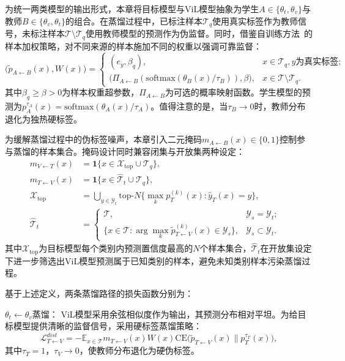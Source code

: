 为统一两类模型的输出形式，本章将目标模型与ViL模型抽象为学生$A\in\{\theta_t,\theta_v\}$与教师$B\in\{\theta_v,\theta_t\}$的组合。在蒸馏过程中，已标注样本$\mathcal{T}_q$使用真实标签作为教师信号，未标注样本$\mathcal{T}\setminus\mathcal{T}_q$使用教师模型的预测作为伪监督。同时，借鉴自训练方法~\cite{liang2021source}的样本加权策略，对不同来源的样本施加不同的权重以强调可靠监督：
\begin{equation}
\big(\tilde{p}_{A\leftarrow B}(x), W(x)\big) =
\begin{cases}
(e_y, \beta_q), & x\in\mathcal{T}_q, y\text{为真实标签};\\
\big(\Pi_{A\leftarrow B}(\mathrm{softmax}(\theta_B(x)/\tau_B)), \beta\big), & x\in\mathcal{T}\setminus\mathcal{T}_q.
\end{cases}
\label{eq:teacher_dist}
\end{equation}
其中$\beta_q\geq\beta>0$为样本权重超参数，$\Pi_{A\leftarrow B}$为可选的概率映射函数。学生模型的预测为$p_A^{\tau_A}(x)=\mathrm{softmax}(\theta_A(x)/\tau_A)$。值得注意的是，当$\tau_B\to 0$时，教师分布退化为独热硬标签。

为缓解蒸馏过程中的伪标签噪声，本章引入二元掩码$m_{A\leftarrow B}(x)\in\{0,1\}$控制参与蒸馏的样本集合。掩码设计同时兼容闭集与开放集两种设定：
\begin{align}
m_{V\leftarrow T}(x) &= \mathbf{1}\{x\in\mathcal{X}_{\text{top}}\cup\mathcal{T}_q\}, &\\
m_{T\leftarrow V}(x) &= \mathbf{1}\{x\in\hat{\mathcal{T}}_t\cup\mathcal{T}_q\}, &\\[3pt]
\mathcal{X}_{\text{top}} &= \bigcup_{y\in\mathcal{Y}_t}\mathrm{top}\text{-}N\big\{\max_k p_T^{(k)}(x) : \hat{y}_T(x)=y\big\}, \label{eq:topX} &\\[3pt]
\hat{\mathcal{T}}_t &=
\begin{cases}
\mathcal{T}, & \mathcal{Y}_s=\mathcal{Y}_t;\\
\{x\in\mathcal{T}: \arg\max_k\tilde{p}_{T\leftarrow V}^{(k)}(x)\in\mathcal{Y}_s\}, & \mathcal{Y}_s\subset\mathcal{Y}_t.
\end{cases}
\end{align}
其中$\mathcal{X}_{\text{top}}$为目标模型每个类别内预测置信度最高的$N$个样本集合，$\hat{\mathcal{T}}_t$在开放集设定下进一步筛选出ViL模型预测属于已知类别的样本，避免未知类别样本污染蒸馏过程。

基于上述定义，两条蒸馏路径的损失函数分别为：

$\theta_t\leftarrow\theta_v$蒸馏： ViL模型采用余弦相似度作为输出，其预测分布相对平坦。为给目标模型提供清晰的监督信号，采用硬标签蒸馏策略：
\begin{equation}
\mathcal{L}_{T\leftarrow V}^{dist} = -\mathbb{E}_{x\in\mathcal{T}}m_{T\leftarrow V}(x)W(x)\mathrm{CE}\big(\tilde{p}_{T\leftarrow V}(x) \| p_T^{\tau_T}(x)\big),
\label{eq:dist_t_from_v}
\end{equation}
其中$\tau_T=1$，$\tau_V\to 0$，使教师分布退化为硬伪标签。


